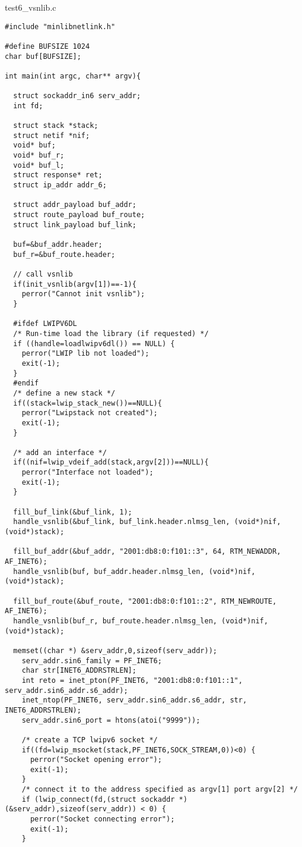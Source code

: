 test6\_vsnlib.c
\begin{lstlisting}[style=CscriptStyle]
#include "minlibnetlink.h"

#define BUFSIZE 1024
char buf[BUFSIZE];

int main(int argc, char** argv){

  struct sockaddr_in6 serv_addr;
  int fd;

  struct stack *stack;
  struct netif *nif;
  void* buf;
  void* buf_r;
  void* buf_l;
  struct response* ret;
  struct ip_addr addr_6;

  struct addr_payload buf_addr;
  struct route_payload buf_route;
  struct link_payload buf_link;

  buf=&buf_addr.header;
  buf_r=&buf_route.header;

  // call vsnlib
  if(init_vsnlib(argv[1])==-1){
    perror("Cannot init vsnlib");
  }

  #ifdef LWIPV6DL
  /* Run-time load the library (if requested) */
  if ((handle=loadlwipv6dl()) == NULL) {
    perror("LWIP lib not loaded");
    exit(-1);
  }
  #endif
  /* define a new stack */
  if((stack=lwip_stack_new())==NULL){
    perror("Lwipstack not created");
    exit(-1);
  }

  /* add an interface */
  if((nif=lwip_vdeif_add(stack,argv[2]))==NULL){
    perror("Interface not loaded");
    exit(-1);
  }

  fill_buf_link(&buf_link, 1);
  handle_vsnlib(&buf_link, buf_link.header.nlmsg_len, (void*)nif, (void*)stack);

  fill_buf_addr(&buf_addr, "2001:db8:0:f101::3", 64, RTM_NEWADDR, AF_INET6);
  handle_vsnlib(buf, buf_addr.header.nlmsg_len, (void*)nif, (void*)stack);

  fill_buf_route(&buf_route, "2001:db8:0:f101::2", RTM_NEWROUTE, AF_INET6);
  handle_vsnlib(buf_r, buf_route.header.nlmsg_len, (void*)nif, (void*)stack);

  memset((char *) &serv_addr,0,sizeof(serv_addr));
    serv_addr.sin6_family = PF_INET6;
    char str[INET6_ADDRSTRLEN];
    int reto = inet_pton(PF_INET6, "2001:db8:0:f101::1", serv_addr.sin6_addr.s6_addr);
    inet_ntop(PF_INET6, serv_addr.sin6_addr.s6_addr, str, INET6_ADDRSTRLEN);
    serv_addr.sin6_port = htons(atoi("9999"));

    /* create a TCP lwipv6 socket */
    if((fd=lwip_msocket(stack,PF_INET6,SOCK_STREAM,0))<0) {
      perror("Socket opening error");
      exit(-1);
    }
    /* connect it to the address specified as argv[1] port argv[2] */
    if (lwip_connect(fd,(struct sockaddr *)(&serv_addr),sizeof(serv_addr)) < 0) {
      perror("Socket connecting error");
      exit(-1);
    }


\end{lstlisting}
